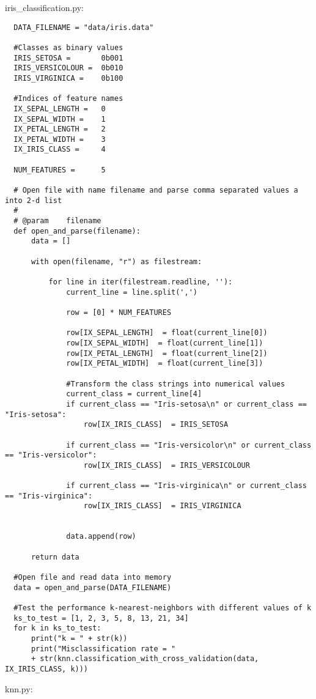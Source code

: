 \documentclass[a4paper]{article}
\begin{document}
  \noindent
  iris\_classification.py:\\
  \begin{lstlisting}
  DATA_FILENAME = "data/iris.data"

  #Classes as binary values
  IRIS_SETOSA =       0b001
  IRIS_VERSICOLOUR =  0b010
  IRIS_VIRGINICA =    0b100

  #Indices of feature names
  IX_SEPAL_LENGTH =   0
  IX_SEPAL_WIDTH =    1
  IX_PETAL_LENGTH =   2
  IX_PETAL_WIDTH =    3
  IX_IRIS_CLASS =     4

  NUM_FEATURES =      5

  # Open file with name filename and parse comma separated values a into 2-d list
  #
  # @param    filename
  def open_and_parse(filename):
      data = []

      with open(filename, "r") as filestream:

          for line in iter(filestream.readline, ''):
              current_line = line.split(',')

              row = [0] * NUM_FEATURES

              row[IX_SEPAL_LENGTH]  = float(current_line[0])
              row[IX_SEPAL_WIDTH]  = float(current_line[1])
              row[IX_PETAL_LENGTH]  = float(current_line[2])
              row[IX_PETAL_WIDTH]  = float(current_line[3])

              #Transform the class strings into numerical values
              current_class = current_line[4]
              if current_class == "Iris-setosa\n" or current_class == "Iris-setosa":
                  row[IX_IRIS_CLASS]  = IRIS_SETOSA

              if current_class == "Iris-versicolor\n" or current_class == "Iris-versicolor":
                  row[IX_IRIS_CLASS]  = IRIS_VERSICOLOUR

              if current_class == "Iris-virginica\n" or current_class == "Iris-virginica":
                  row[IX_IRIS_CLASS]  = IRIS_VIRGINICA


              data.append(row)

      return data

  #Open file and read data into memory
  data = open_and_parse(DATA_FILENAME)

  #Test the performance k-nearest-neighbors with different values of k
  ks_to_test = [1, 2, 3, 5, 8, 13, 21, 34]
  for k in ks_to_test:
      print("k = " + str(k))
      print("Misclassification rate = " 
      + str(knn.classification_with_cross_validation(data, IX_IRIS_CLASS, k)))

  \end{lstlisting}
  \vspace*{3cm}
  knn.py:\\
\end{document}

